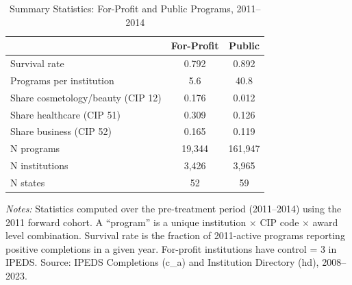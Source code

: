 \begin{table}[H]
\centering
\caption{Summary Statistics: For-Profit and Public Programs, 2011--2014}
\label{tab:summary}
\begin{threeparttable}
\begin{tabular}{lcc}
\toprule
 & For-Profit & Public \\
\midrule
Survival rate & 0.792 & 0.892 \\
Programs per institution & 5.6 & 40.8 \\
Share cosmetology/beauty (CIP 12) & 0.176 & 0.012 \\
Share healthcare (CIP 51) & 0.309 & 0.126 \\
Share business (CIP 52) & 0.165 & 0.119 \\
N programs & 19,344 & 161,947 \\
N institutions & 3,426 & 3,965 \\
N states & 52 & 59 \\
\bottomrule
\end{tabular}
\begin{tablenotes}[flushleft]
\small
\item \textit{Notes:} Statistics computed over the pre-treatment period (2011--2014) using the 2011 forward cohort. A ``program'' is a unique institution $\times$ CIP code $\times$ award level combination. Survival rate is the fraction of 2011-active programs reporting positive completions in a given year. For-profit institutions have control = 3 in IPEDS. Source: IPEDS Completions (c\_a) and Institution Directory (hd), 2008--2023.
\end{tablenotes}
\end{threeparttable}
\end{table}

